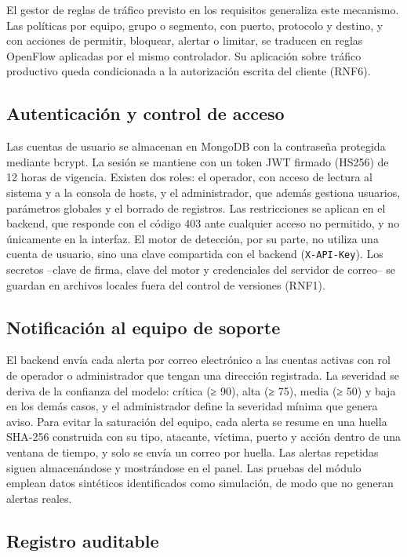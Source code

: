 El gestor de reglas de tráfico previsto en los requisitos generaliza este mecanismo. Las políticas por equipo, grupo o segmento, con puerto, protocolo y destino, y con acciones de permitir, bloquear, alertar o limitar, se traducen en reglas OpenFlow aplicadas por el mismo controlador. Su aplicación sobre tráfico productivo queda condicionada a la autorización escrita del cliente (RNF6).

\subsection{Autenticación y control de acceso}

Las cuentas de usuario se almacenan en MongoDB con la contraseña protegida mediante bcrypt. La sesión se mantiene con un token JWT firmado (HS256) de 12 horas de vigencia. Existen dos roles: el operador, con acceso de lectura al sistema y a la consola de hosts, y el administrador, que además gestiona usuarios, parámetros globales y el borrado de registros. Las restricciones se aplican en el backend, que responde con el código 403 ante cualquier acceso no permitido, y no únicamente en la interfaz. El motor de detección, por su parte, no utiliza una cuenta de usuario, sino una clave compartida con el backend (\texttt{X-API-Key}). Los secretos --clave de firma, clave del motor y credenciales del servidor de correo-- se guardan en archivos locales fuera del control de versiones (RNF1).

\subsection{Notificación al equipo de soporte}

El backend envía cada alerta por correo electrónico a las cuentas activas con rol de operador o administrador que tengan una dirección registrada. La severidad se deriva de la confianza del modelo: crítica (≥ 90), alta (≥ 75), media (≥ 50) y baja en los demás casos, y el administrador define la severidad mínima que genera aviso. Para evitar la saturación del equipo, cada alerta se resume en una huella SHA-256 construida con su tipo, atacante, víctima, puerto y acción dentro de una ventana de tiempo, y solo se envía un correo por huella. Las alertas repetidas siguen almacenándose y mostrándose en el panel. Las pruebas del módulo emplean datos sintéticos identificados como simulación, de modo que no generan alertas reales.

\subsection{Registro auditable}

